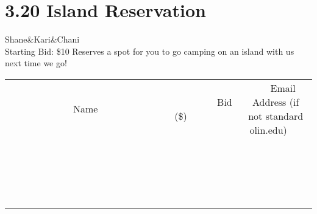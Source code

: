 \documentclass[11pt]{article}
\begin{document}
\section*{3.20 Island Reservation}
Shane\&Kari\&Chani
\\
Starting Bid: \$10
\newline
Reserves a spot for you to go camping on an island with us next time we go!
\\[3ex]
\begin{tabular}{c c c}
~~~~~~~~~~~~~Name~~~~~~~~~~~~~ & ~~~~~~~~~Bid (\$)~~~~~~~~~  & ~~~Email Address (if not standard olin.edu)~~~\\
 & & \\
\hline
 & & \\
\hline
 & & \\
\hline
 & & \\
\hline
 & & \\
\hline
 & & \\
\hline
 & & \\
\hline
 & & \\
\hline
 & & \\
\hline
 & & \\
\hline
 & & \\
\hline
 & & \\
\hline
 & & \\
\hline
 & & \\
\hline
 & & \\
\hline
 & & \\
\hline
 & & \\
\hline
 & & \\
\hline
 & & \\
\hline
\end{tabular}
\newpage
\end{document}

